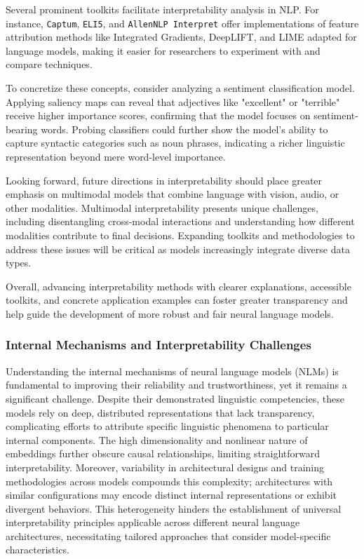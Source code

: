 \documentclass[sigconf]{acmart}
\begin{document}
Several prominent toolkits facilitate interpretability analysis in NLP. For instance, \texttt{Captum}, \texttt{ELI5}, and \texttt{AllenNLP Interpret} offer implementations of feature attribution methods like Integrated Gradients, DeepLIFT, and LIME adapted for language models, making it easier for researchers to experiment with and compare techniques.

To concretize these concepts, consider analyzing a sentiment classification model. Applying saliency maps can reveal that adjectives like "excellent" or "terrible" receive higher importance scores, confirming that the model focuses on sentiment-bearing words. Probing classifiers could further show the model’s ability to capture syntactic categories such as noun phrases, indicating a richer linguistic representation beyond mere word-level importance.

Looking forward, future directions in interpretability should place greater emphasis on multimodal models that combine language with vision, audio, or other modalities. Multimodal interpretability presents unique challenges, including disentangling cross-modal interactions and understanding how different modalities contribute to final decisions. Expanding toolkits and methodologies to address these issues will be critical as models increasingly integrate diverse data types.

Overall, advancing interpretability methods with clearer explanations, accessible toolkits, and concrete application examples can foster greater transparency and help guide the development of more robust and fair neural language models.

\subsubsection{Internal Mechanisms and Interpretability Challenges}

Understanding the internal mechanisms of neural language models (NLMs) is fundamental to improving their reliability and trustworthiness, yet it remains a significant challenge. Despite their demonstrated linguistic competencies, these models rely on deep, distributed representations that lack transparency, complicating efforts to attribute specific linguistic phenomena to particular internal components. The high dimensionality and nonlinear nature of embeddings further obscure causal relationships, limiting straightforward interpretability. Moreover, variability in architectural designs and training methodologies across models compounds this complexity; architectures with similar configurations may encode distinct internal representations or exhibit divergent behaviors. This heterogeneity hinders the establishment of universal interpretability principles applicable across different neural language architectures, necessitating tailored approaches that consider model-specific characteristics.
\end{document}
